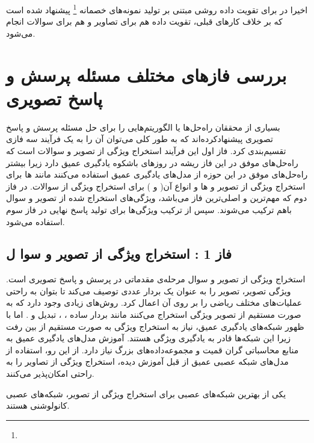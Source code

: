   اخیرا در
 \cite{tang2020semantic}
 برای تقویت داده روشی مبتنی بر تولید نمونه‌های خصمانه
 \footnote{}
 پیشنهاد شده است که بر خلاف کارهای قبلی، تقویت داده هم برای تصاویر و هم برای سوالات انجام می‌شود.
 
 
\section{بررسی فازهای مختلف مسئله پرسش و پاسخ تصویری}
بسیاری از محققان راه‌حل‌ها یا الگوریتم‌هایی را برای حل مسئله پرسش و پاسخ تصویری پیشنهاد‌کرده‌اند که به طور کلی می‌توان آن را به یک فرآیند سه فازی تقسیم‌بندی کرد. فاز اول این فرآیند استخراج ویژگی از تصویر و سوالات است که راه‌حل‌های موفق در این فاز ریشه در روزهای باشکوه یادگیری عمیق دارد زیرا بیشتر راه‌حل‌های موفق در این حوزه از مدل‌های یادگیری عمیق استفاده می‌کنند مانند 
 ها برای استخراج ویژگی از  تصویر و 
  ها و انواع آن(
  و
  ) برای استخراج ویژگی از سوالات. در فاز دوم که مهم‌ترین و اصلی‌ترین فاز می‌باشد، ویژگی‌های استخراج شده از تصویر و سوال باهم ترکیب می‌شوند. سپس از ترکیب ویژگی‌ها برای تولید پاسخ نهایی در فاز سوم استفاده می‌شود.
\subsection{فاز 1 : استخراج ویژگی از تصویر و سوا ل} \label{sec:extract}

		استخراج ویژگی از تصویر و سوال مرحله‌ی مقدماتی در پرسش و پاسخ تصویری است. ویژگی تصویر، تصویر را به عنوان یک بردار عددی  توصیف می‌کند تا بتوان به راحتی عملیات‌های مختلف ریاضی را بر روی آن اعمال کرد. روش‌های زیادی وجود دارد که به صورت مستقیم از تصویر ویژگی استخراج می‌کنند مانند بردار ساده 
		،
		، تبدیل
		و 
		.
		اما با ظهور شبکه‌های یادگیری عمیق، نیاز به استخراج ویژگی به صورت مستقیم از بین رفت زیرا این شبکه‌ها قادر به یادگیری ویژگی هستند. آموزش مدل‌های یادگیری عمیق به منابع محاسباتی گران قمیت و مجموعه‌داده‌های بزرگ نیاز دارد. از این رو، استفاده از مدل‌های شبکه عصبی عمیق از قبل آموزش دیده، استخراج ویژگی‌ از تصاویر را به راحتی امکان‌پذیر می‌کنند. 
		
		یکی از بهترین شبکه‌های عصبی برای استخراج ویژگی از تصویر، شبکه‌های عصبی کانولوشنی هستند. 
			
